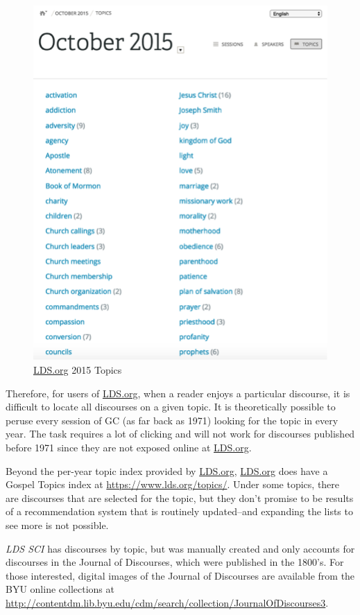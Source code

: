 \begin{figure}[hhhhhtb]
	\centering
		\includegraphics[width=4.5in,natwidth=410,natheight=542]{figures/oct_2015_topics.png}
		\caption[\url{LDS.org} 2015 Topics]{
			\url{LDS.org} 2015 Topics
		}
	\label{fig:oct_2015_topics}
\end{figure}

Therefore, for users of \url{LDS.org}, when a reader enjoys a particular discourse, it is difficult to locate all discourses on a given topic. It is theoretically possible to peruse every session of GC (as far back as 1971) looking for the topic in every year. The task requires a lot of clicking and will not work for discourses published before 1971 since they are not exposed online at \url{LDS.org}.

Beyond the per-year topic index provided by \url{LDS.org}, \url{LDS.org} does have a Gospel Topics index at \url{https://www.lds.org/topics/}. Under some topics, there are discourses that are selected for the topic, but they don’t promise to be results of a recommendation system that is routinely updated--and expanding the lists to see more is not possible.

\emph{LDS SCI} has discourses by topic, but was manually created and only accounts for discourses in the Journal of Discourses, which were published in the 1800’s. For those interested, digital images of the Journal of Discourses are available from the BYU online collections at \url{http://contentdm.lib.byu.edu/cdm/search/collection/JournalOfDiscourses3}.

